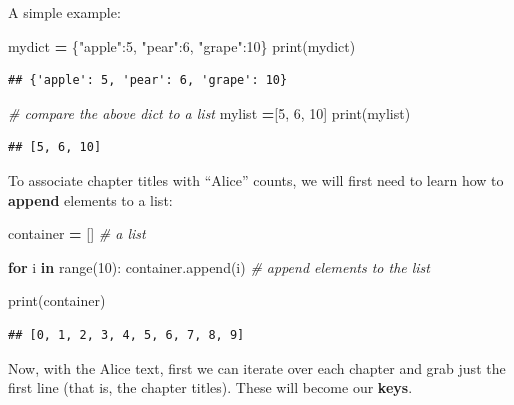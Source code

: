 \documentclass[
]{book}
\newenvironment{Shaded}{\begin{snugshade}}{\end{snugshade}}
\newcommand{\BuiltInTok}[1]{#1}
\newcommand{\CommentTok}[1]{\textcolor[rgb]{0.56,0.35,0.01}{\textit{#1}}}
\newcommand{\ControlFlowTok}[1]{\textcolor[rgb]{0.13,0.29,0.53}{\textbf{#1}}}
\newcommand{\DecValTok}[1]{\textcolor[rgb]{0.00,0.00,0.81}{#1}}
\newcommand{\KeywordTok}[1]{\textcolor[rgb]{0.13,0.29,0.53}{\textbf{#1}}}
\newcommand{\NormalTok}[1]{#1}
\newcommand{\OperatorTok}[1]{\textcolor[rgb]{0.81,0.36,0.00}{\textbf{#1}}}
\newcommand{\StringTok}[1]{\textcolor[rgb]{0.31,0.60,0.02}{#1}}
\begin{document}
A simple example:

\begin{Shaded}
\begin{Highlighting}[]
\NormalTok{mydict }\OperatorTok{=}\NormalTok{ \{}\StringTok{"apple"}\NormalTok{:}\DecValTok{5}\NormalTok{, }\StringTok{"pear"}\NormalTok{:}\DecValTok{6}\NormalTok{, }\StringTok{"grape"}\NormalTok{:}\DecValTok{10}\NormalTok{\}}
\BuiltInTok{print}\NormalTok{(mydict)}
\end{Highlighting}
\end{Shaded}

\begin{verbatim}
## {'apple': 5, 'pear': 6, 'grape': 10}
\end{verbatim}

\begin{Shaded}
\begin{Highlighting}[]
\CommentTok{\# compare the above dict to a list}
\NormalTok{mylist }\OperatorTok{=}\NormalTok{[}\DecValTok{5}\NormalTok{, }\DecValTok{6}\NormalTok{, }\DecValTok{10}\NormalTok{]}
\BuiltInTok{print}\NormalTok{(mylist)}
\end{Highlighting}
\end{Shaded}

\begin{verbatim}
## [5, 6, 10]
\end{verbatim}

To associate chapter titles with ``Alice'' counts, we will first need to learn how to \textbf{append} elements to a list:

\begin{Shaded}
\begin{Highlighting}[]
\NormalTok{container }\OperatorTok{=}\NormalTok{ [] }\CommentTok{\# a list}

\ControlFlowTok{for}\NormalTok{ i }\KeywordTok{in} \BuiltInTok{range}\NormalTok{(}\DecValTok{10}\NormalTok{):}
\NormalTok{    container.append(i) }\CommentTok{\# append elements to the list}

\BuiltInTok{print}\NormalTok{(container)    }
\end{Highlighting}
\end{Shaded}

\begin{verbatim}
## [0, 1, 2, 3, 4, 5, 6, 7, 8, 9]
\end{verbatim}

Now, with the Alice text, first we can iterate over each chapter and grab just the first line (that is, the chapter titles). These will become our \textbf{keys}.
\end{document}
